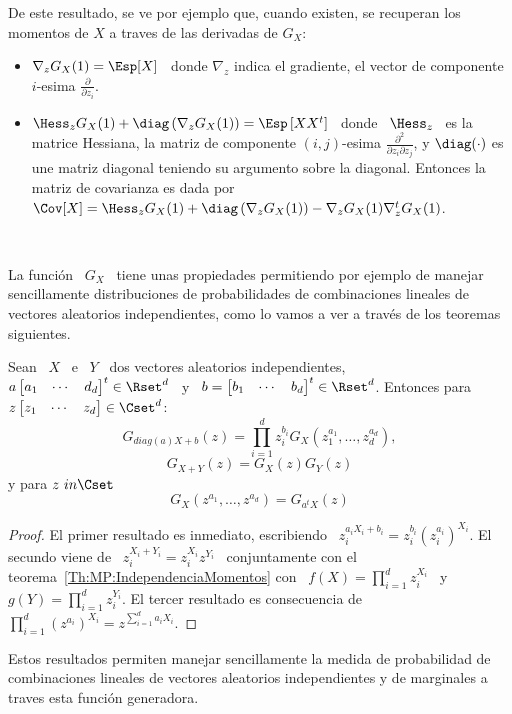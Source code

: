 De  este resultado,  se ve  por ejemplo  que, cuando  existen, se  recuperan los
momentos de $X$ a traves de las derivadas de $G_X$:
%
\begin{itemize}
\item $\nabla_z G_X(1) = \Esp[X]$ \ donde $\nabla_z$ indica el gradiente, \ie el
  vector de componente $i$-esima $\frac{\partial}{\partial z_i}$.
%
\item $\Hess_z G_X(1)  + \diag\left( \nabla_z G_X(1) \right)  = \Esp\left[ X X^t
  \right]$  \ donde  \ $\Hess_z$  \ es  la matrice  Hessiana, \ie  la  matriz de
  componente  $(i,j)$-esima $\frac{\partial^2}{\partial  z_i  \partial z_j}$,  y
  $\diag(\cdot)$  es  une  matriz   diagonal  teniendo  su  argumento  sobre  la
  diagonal.  Entonces la matriz  de covarianza  es dada  por $\Cov[X]  = \Hess_z
  G_X(1)  + \diag\left(  \nabla_z G_X(1)  \right) -  \nabla_z  G_X(1) \nabla_z^t
  G_X(1)$.
\end{itemize}

\

La funci\'on \ $G_X$ \ tiene unas propiedades permitiendo por ejemplo de manejar
sencillamente  distribuciones  de probabilidades  de  combinaciones lineales  de
vectores  aleatorios independientes,  como  lo vamos  a  ver a  trav\'es de  los
teoremas siguientes.

\begin{teorema}%
  Sean   \  $X$  \   e  \   $Y$  \   dos  vectores   aleatorios  independientes,
  $a \begin{bmatrix}  a_1 &  \cdots & d_d  \end{bmatrix}^t \in  \Rset^d$ \ y  \ $b
  = \begin{bmatrix} b_1 & \cdots & b_d \end{bmatrix}^t \in \Rset^d$. Entonces para
  $z \begin{bmatrix} z_1 & \cdots & z_d \end{bmatrix}\in \Cset^d$:
  \[
  G_{diag(a) X + b}(z) =  \prod_{i=1}^d z_i^{b_i} G_X\left( z_1^{a_1} , \ldots ,
    z_d^{a_d} \right),
  \]
  \[
  G_{X+Y}(z) = G_X(z) G_Y(z)
  \]
  y para $z\ in \Cset$
  \[
  G_X\left( z^{a_1} , \ldots , z^{a_d} \right) = G_{a^t X}(z)
  \]
\end{teorema}
%
\begin{proof}
  El  primer  resultado es  inmediato,  escribiendo \  $z_i^{a_i  X_i  + b_i}  =
  z_i^{b_i}   \left(  z_i^{a_i}   \right)^{X_i}$.    El  secundo   viene  de   \
  $z_i^{X_i+Y_i}    =    z_i^{X_i}    z^{Y_i}$    \   conjuntamente    con    el
  teorema~\ref{Th:MP:IndependenciaMomentos}   con   \   $f(X)  =   \prod_{i=1}^d
  z_i^{X_i}$  \ y \  $g(Y) =  \prod_{i=1}^d z_i^{Y_i}$.  El tercer  resultado es
  consecuencia de $\prod_{i=1}^d  \left( z^{a_i} \right)^{X_i} = z^{\sum_{i=1}^d
    a_i X_i}$.
\end{proof}
%
Estos  resultados permiten manejar  sencillamente la  medida de  probabilidad de
combinaciones lineales  de vectores aleatorios independientes y  de marginales a
traves esta funci\'on generadora.

